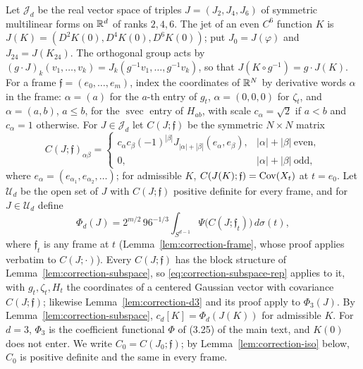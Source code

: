 \begin{definition}\label{def:correction-jets}
Let $\mathcal J_d$ be the real vector space of triples $J=(J_2,J_4,J_6)$ of symmetric multilinear forms on $\mathbb R^d$ of ranks $2,4,6$. The jet of an even $C^6$ function $K$ is $J(K)=(D^2K(0),D^4K(0),D^6K(0))$; put $J_0=J(\varphi)$ and $J_{24}=J(K_{24})$. The orthogonal group acts by $(g\cdot J)_k(v_1,\dots,v_k)=J_k(g^{-1}v_1,\dots,g^{-1}v_k)$, so that $J(K\circ g^{-1})=g\cdot J(K)$. For a frame $\mathfrak f=(e_0,\dots,e_m)$, index the coordinates of $\mathbb R^N$ by derivative words $\alpha$ in the frame: $\alpha=(a)$ for the $a$-th entry of $g_t$, $\alpha=(0,0,0)$ for $\zeta_t$, and $\alpha=(a,b)$, $a\le b$, for the $\operatorname{svec}$ entry of $H_{ab}$, with scale $c_\alpha=\sqrt2$ if $a<b$ and $c_\alpha=1$ otherwise. For $J\in\mathcal J_d$ let $C(J;\mathfrak f)$ be the symmetric $N\times N$ matrix
\begin{equation}\label{eq:correction-CJ}
C(J;\mathfrak f)_{\alpha\beta}=\begin{cases}c_\alpha c_\beta(-1)^{|\beta|}J_{|\alpha|+|\beta|}(e_\alpha,e_\beta),&|\alpha|+|\beta|\ \text{even},\\ 0,&|\alpha|+|\beta|\ \text{odd},\end{cases}
\end{equation}
where $e_\alpha=(e_{\alpha_1},e_{\alpha_2},\dots)$; for admissible $K$, $C(J(K);\mathfrak f)=\operatorname{Cov}(X_t)$ at $t=e_0$. Let $\mathcal U_d$ be the open set of $J$ with $C(J;\mathfrak f)$ positive definite for every frame, and for $J\in\mathcal U_d$ define
\begin{equation}\label{eq:correction-Phi}
\Phi_d(J)=2^{m/2}\,96^{-1/3}\int_{S^{d-1}}\Psi\bigl(C(J;\mathfrak f_t)\bigr)\,d\sigma(t),
\end{equation}
where $\mathfrak f_t$ is any frame at $t$ (Lemma~\ref{lem:correction-frame}, whose proof applies verbatim to $C(J;\cdot)$). Every $C(J;\mathfrak f)$ has the block structure of Lemma~\ref{lem:correction-subspace}, so \eqref{eq:correction-subspace-rep} applies to it, with $g_t,\zeta_t,H_t$ the coordinates of a centered Gaussian vector with covariance $C(J;\mathfrak f)$; likewise Lemma~\ref{lem:correction-d3} and its proof apply to $\Phi_3(J)$. By Lemma~\ref{lem:correction-subspace}, $c_d[K]=\Phi_d(J(K))$ for admissible $K$. For $d=3$, $\Phi_3$ is the coefficient functional $\Phi$ of (3.25) of the main text, and $K(0)$ does not enter. We write $C_0=C(J_0;\mathfrak f)$; by Lemma~\ref{lem:correction-iso} below, $C_0$ is positive definite and the same in every frame.
\end{definition}

